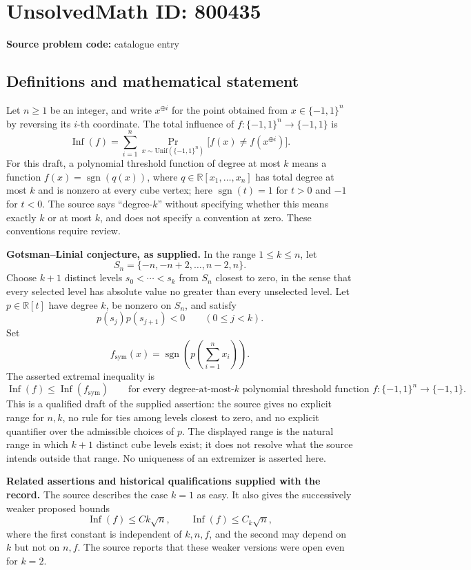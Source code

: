 \documentclass[11pt]{article}
\newcommand{\R}{\mathbb{R}}
\begin{document}
\section*{UnsolvedMath ID: 800435}
\textbf{Source problem code:} catalogue entry
\subsection{Definitions and mathematical statement}
Let \(n\geq 1\) be an integer, and write \(x^{\oplus i}\) for the point obtained from \(x\in\{-1,1\}^n\) by reversing its \(i\)-th coordinate. The total influence of \(f:\{-1,1\}^n\to\{-1,1\}\) is
\[
\operatorname{Inf}(f)=\sum_{i=1}^n\Pr_{x\sim\mathrm{Unif}(\{-1,1\}^n)}\bigl[f(x)\ne f(x^{\oplus i})\bigr].
\]
For this draft, a polynomial threshold function of degree at most \(k\) means a function \(f(x)=\operatorname{sgn}(q(x))\), where \(q\in\R[x_1,\ldots,x_n]\) has total degree at most \(k\) and is nonzero at every cube vertex; here \(\operatorname{sgn}(t)=1\) for \(t>0\) and \(-1\) for \(t<0\). The source says ``degree-\(k\)'' without specifying whether this means exactly \(k\) or at most \(k\), and does not specify a convention at zero. These conventions require review.

\textbf{Gotsman--Linial conjecture, as supplied.} In the range \(1\leq k\leq n\), let
\[
S_n=\{-n,-n+2,\ldots,n-2,n\}.
\]
Choose \(k+1\) distinct levels \(s_0<\cdots<s_k\) from \(S_n\) closest to zero, in the sense that every selected level has absolute value no greater than every unselected level. Let \(p\in\R[t]\) have degree \(k\), be nonzero on \(S_n\), and satisfy
\[
p(s_j)p(s_{j+1})<0\qquad(0\leq j<k).
\]
Set
\[
f_{\mathrm{sym}}(x)=\operatorname{sgn}\!\left(p\!\left(\sum_{i=1}^n x_i\right)\right).
\]
The asserted extremal inequality is
\[
\operatorname{Inf}(f)\leq\operatorname{Inf}(f_{\mathrm{sym}})
\qquad\text{for every degree-at-most-\(k\) polynomial threshold function }f:\{-1,1\}^n\to\{-1,1\}.
\]
This is a qualified draft of the supplied assertion: the source gives no explicit range for \(n,k\), no rule for ties among levels closest to zero, and no explicit quantifier over the admissible choices of \(p\). The displayed range is the natural range in which \(k+1\) distinct cube levels exist; it does not resolve what the source intends outside that range. No uniqueness of an extremizer is asserted here.

\textbf{Related assertions and historical qualifications supplied with the record.} The source describes the case \(k=1\) as easy. It also gives the successively weaker proposed bounds
\[
\operatorname{Inf}(f)\leq Ck\sqrt n,
\qquad
\operatorname{Inf}(f)\leq C_k\sqrt n,
\]
where the first constant is independent of \(k,n,f\), and the second may depend on \(k\) but not on \(n,f\). The source reports that these weaker versions were open even for \(k=2\).
\end{document}
